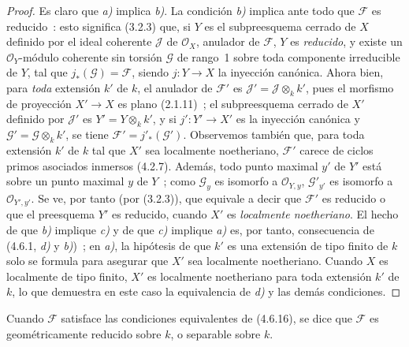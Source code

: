 \begin{proof}
Es claro que \emph{a)} implica \emph{b)}. La condición \emph{b)} implica ante todo que $\mathscr F$
es reducido~: esto significa (3.2.3) que, si $Y$ es el subpreesquema cerrado de
$X$ definido por el ideal coherente $\mathscr J$ de $\mathcal O_X$, anulador de
$\mathscr F$, $Y$ es \emph{reducido}, y existe un $\mathcal O_Y$-módulo coherente sin
torsión $\mathscr G$ de rango~1 sobre toda componente irreducible de $Y$, tal
que $j_*(\mathscr G)=\mathscr F$, siendo $j:Y\to X$ la inyección canónica.
Ahora bien, para \emph{toda} extensión $k'$ de $k$, el anulador de $\mathscr F'$ es
$\mathscr J'=\mathscr J\otimes_k k'$, pues el morfismo de proyección
$X'\to X$ es plano (2.1.11)~; el subpreesquema cerrado de $X'$ definido por
$\mathscr J'$ es $Y'=Y\otimes_k k'$, y si $j':Y'\to X'$ es la inyección
canónica y $\mathscr G'=\mathscr G\otimes_k k'$, se tiene
$\mathscr F'=j'_*(\mathscr G')$. Observemos también que, para toda extensión
$k'$ de $k$ tal que $X'$ sea localmente noetheriano, $\mathscr F'$ carece de
ciclos primos asociados inmersos (4.2.7). Además, todo punto maximal $y'$ de
$Y'$ está sobre un punto maximal $y$ de $Y$~; como $\mathscr G_y$ es isomorfo
a $\mathcal O_{Y,y}$, $\mathscr G'_{y'}$ es isomorfo a
$\mathcal O_{Y',y'}$. Se ve, por tanto (por (3.2.3)), que equivale a decir que
$\mathscr F'$ es reducido o que el preesquema $Y'$ es reducido, cuando $X'$ es
\emph{localmente noetheriano}. El hecho de que \emph{b)} implique \emph{c)} y de que \emph{c)} implique \emph{a)}
es, por tanto, consecuencia de (4.6.1, \emph{d)} y \emph{b)})~; en \emph{a)}, la hipótesis de que
$k'$ es una extensión de tipo finito de $k$ solo se formula para asegurar que
$X'$ sea localmente noetheriano. Cuando $X$ es localmente de tipo finito,
$X'$ es localmente noetheriano para toda extensión $k'$ de $k$, lo que
demuestra en este caso la equivalencia de \emph{d)} y las demás condiciones.
\end{proof}

\begin{definition}[4.6.17]
\label{IV.2.4.6.17-fr}
Cuando $\mathscr F$ satisface las condiciones equivalentes de \textup{(4.6.16)}, se
dice que $\mathscr F$ es geométricamente reducido sobre $k$, o
separable sobre $k$.
\end{definition}

